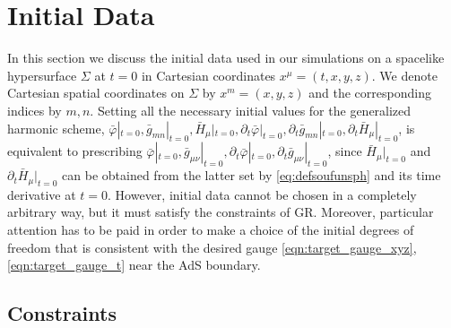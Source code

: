 \documentclass[a4paper,11pt]{article}
\numberwithin{equation}{section}
\begin{document}
\section{Initial Data}
\label{sec:initdata}

In this section we discuss the initial data used in our simulations on a spacelike hypersurface $\Sigma$ at $t=0$ in Cartesian coordinates $x^\mu=(t,x,y,z)$. We denote Cartesian spatial coordinates on $\Sigma$ by $x^m=(x,y,z)$ and the corresponding indices by $m,n$. Setting all the necessary initial values for the generalized harmonic scheme, $\bar{\varphi}|_{t=0},\bar{g}_{mn}|_{t=0},\bar{H}_\mu |_{t=0},\partial_t\bar{\varphi}|_{t=0},\partial_t\bar{g}_{mn}|_{t=0},\partial_t\bar{H}_\mu |_{t=0}$, is equivalent to prescribing $\bar{\varphi}|_{t=0},\bar{g}_{\mu\nu}|_{t=0},\partial_t\bar{\varphi}|_{t=0},\partial_t\bar{g}_{\mu\nu}|_{t=0}$, since $\bar{H}_\mu|_{t=0}$ and $\partial_t\bar{H}_\mu|_{t=0}$ can be obtained from the latter set by \eqref{eq:defsoufunsph} and its time derivative at $t=0$.
However, initial data cannot be chosen in a completely arbitrary way, but it must satisfy the constraints of GR. Moreover, particular attention has to be paid in order to make a choice of the initial degrees of freedom that is consistent with the desired gauge \eqref{eqn:target_gauge_xyz},\eqref{eqn:target_gauge_t} near the AdS boundary. 

\subsection{Constraints}
\label{sec:constr}
\end{document}
